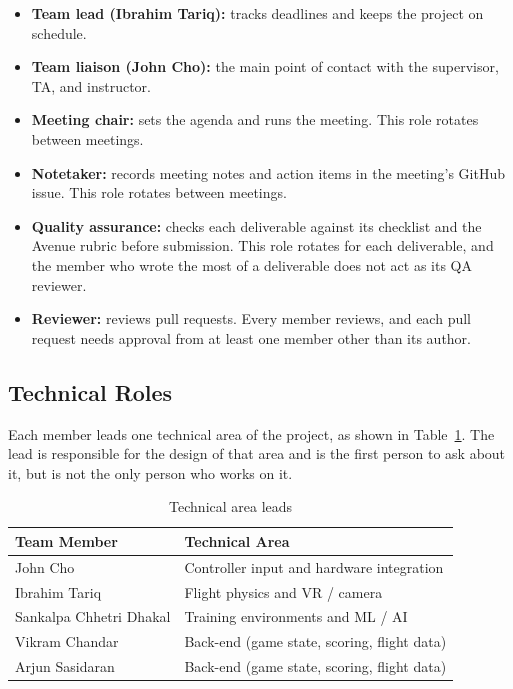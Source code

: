\documentclass{article}
\begin{document}
\begin{itemize}
  \item \textbf{Team lead (Ibrahim Tariq):} tracks deadlines and keeps the
  project on schedule.
  \item \textbf{Team liaison (John Cho):} the main point of contact with the
  supervisor, TA, and instructor.
  \item \textbf{Meeting chair:} sets the agenda and runs the meeting. This
  role rotates between meetings.
  \item \textbf{Notetaker:} records meeting notes and action items in the
  meeting's GitHub issue. This role rotates between meetings.
  \item \textbf{Quality assurance:} checks each deliverable against its
  checklist and the Avenue rubric before submission. This role rotates for
  each deliverable, and the member who wrote the most of a deliverable does
  not act as its QA reviewer.
  \item \textbf{Reviewer:} reviews pull requests. Every member reviews, and
  each pull request needs approval from at least one member other than its
  author.
\end{itemize}

\subsection{Technical Roles}

Each member leads one technical area of the project, as shown in
Table~\ref{tab:techroles}. The lead is responsible for the design of that
area and is the first person to ask about it, but is not the only person who
works on it.

\begin{table}[h]
  \centering
  \begin{tabular}{ll}
    \toprule
    \textbf{Team Member} & \textbf{Technical Area} \\
    \midrule
    John Cho & Controller input and hardware integration \\
    Ibrahim Tariq & Flight physics and VR / camera \\
    Sankalpa Chhetri Dhakal & Training environments and ML / AI \\
    Vikram Chandar & Back-end (game state, scoring, flight data) \\
    Arjun Sasidaran & Back-end (game state, scoring, flight data) \\
    \bottomrule
  \end{tabular}
  \caption{Technical area leads}
  \label{tab:techroles}
\end{table}
\end{document}

